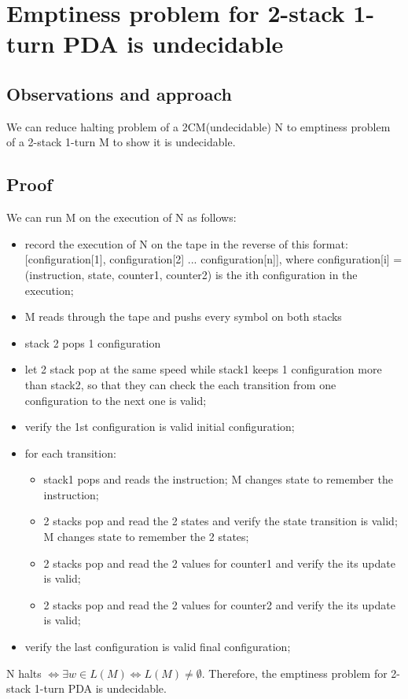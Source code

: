 \documentclass{article}
\begin{document}
\section{Emptiness problem for 2-stack 1-turn PDA is undecidable}

\subsection{Observations and approach}
We can reduce halting problem of a 2CM(undecidable) N to emptiness problem of a 2-stack 1-turn M to show it is undecidable.

\subsection{Proof}
We can run M on the execution of N as follows:
\begin{itemize}
	\item record the execution of N on the tape in the reverse of this format: [configuration[1], configuration[2] ... configuration[n]], where configuration[i] = (instruction, state, counter1, counter2) is the ith configuration in the execution;
	\item M reads through the tape and pushs every symbol on both stacks
	\item stack 2 pops 1 configuration
	\item let 2 stack pop at the same speed while stack1 keeps 1 configuration more than stack2, so that they can check the each transition from one configuration to the next one is valid;
	\item verify the 1st configuration is valid initial configuration;
	\item for each transition:
	\begin{itemize}
		\item stack1 pops and reads the instruction; M changes state to remember the instruction;
		\item 2 stacks pop and read the 2 states and verify the state transition is valid; M changes state to remember the 2 states;
		\item 2 stacks pop and read the 2 values for counter1 and verify the its update is valid;
		\item 2 stacks pop and read the 2 values for counter2 and verify the its update is valid;
	\end{itemize}
	\item verify the last configuration is valid final configuration;
\end{itemize}
N halts $ \iff \exists w \in L(M) \iff L(M) \neq \emptyset$. Therefore, the emptiness problem for 2-stack 1-turn PDA is undecidable.
\end{document}
